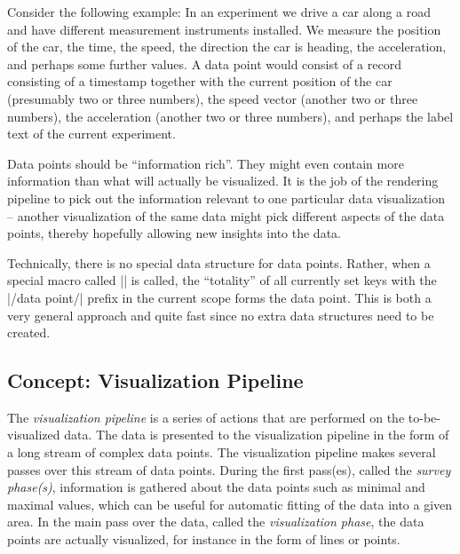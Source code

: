 Consider the following example: In an experiment we drive a car along a road
and have different measurement instruments installed. We measure the position
of the car, the time, the speed, the direction the car is heading, the
acceleration, and perhaps some further values. A data point would consist of a
record consisting of a timestamp together with the current position of the car
(presumably two or three numbers), the speed vector (another two or three
numbers), the acceleration (another two or three numbers), and perhaps the
label text of the current experiment.

Data points should be ``information rich''. They might even contain more
information than what will actually be visualized. It is the job of the
rendering pipeline to pick out the information relevant to one particular data
visualization -- another visualization of the same data might pick different
aspects of the data points, thereby hopefully allowing new insights into the
data.

Technically, there is no special data structure for data points. Rather, when a
special macro called |\pgfdatapoint| is called, the ``totality'' of all
currently set keys with the |/data point/| prefix in the current scope forms
the data point. This is both a very general approach and quite fast since no
extra data structures need to be created.


\subsection{Concept: Visualization Pipeline}

The \emph{visualization pipeline} is a series of actions that are performed on
the to-be-visualized data. The data is presented to the visualization pipeline
in the form of a long stream of  complex data points. The visualization
pipeline makes several passes over this stream of data points. During the first
pass(es), called the \emph{survey phase(s)}, information is gathered about the
data points such as minimal and maximal values, which can be useful for
automatic fitting of the data into a given area. In the main pass over the
data, called the \emph{visualization phase}, the data points are actually
visualized, for instance in the form of lines or points.


